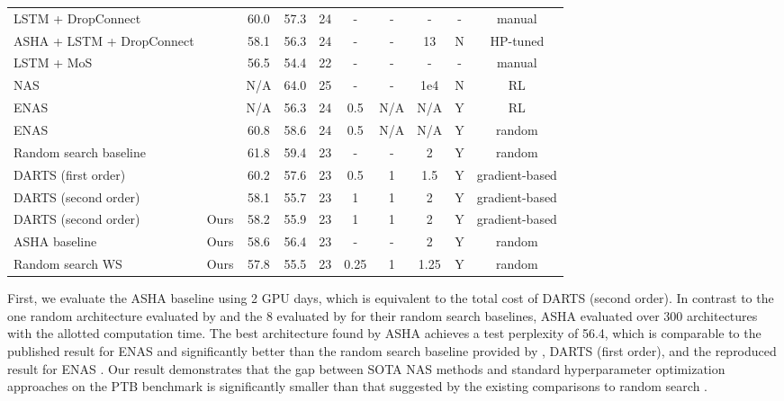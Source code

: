 \documentclass[acmlarge, nonacm]{acmart}
\begin{document}
\begin{table}[h]
{\begin{tabular}{lccccccccc}
\hline
LSTM + DropConnect & \citep{merity2018awd} & 60.0 & 57.3 & 24 & - & - & - & - & manual \\
ASHA + LSTM + DropConnect & \citep{asha} & 58.1 & 56.3 & 24 & - & - & 13 & N & HP-tuned\\
LSTM + MoS & \citep{yang2018breaking} & 56.5 & 54.4 & 22 & - & - & - & - & manual \\
\hline
NAS & \citep{nasRL} & N/A & 64.0 & 25 & - & - & 1e4 &  N & RL \\
ENAS & \citep{pham18ENAS} & N/A & 56.3 & 24 & 0.5 & N/A & N/A & Y & RL \\
ENAS & \citep{liu2018darts} & 60.8 & 58.6 & 24 & 0.5 & N/A & N/A &  Y & random \\
 Random search baseline & \citep{liu2018darts} & 61.8 & 59.4 & 23 & - & - & 2 & Y & random \\
 DARTS (first order)& \citep{liu2018darts}     &  60.2 & 57.6 & 23 & 0.5 & 1 & 1.5 & Y & gradient-based\\
 DARTS (second order)&  \citep{liu2018darts}&  58.1 & 55.7 & 23 & 1 & 1& 2 & Y & gradient-based \\
 \hline
 DARTS (second order)& Ours & 58.2 & 55.9 & 23 & 1 & 1 & 2&Y & gradient-based \\
 ASHA baseline  & Ours & 58.6 & 56.4 & 23 & - & - & 2 & Y & random \\
 Random search WS& Ours & 57.8 & 55.5 & 23 & 0.25 & 1 & 1.25 & Y & random \\
 \hline
 
\end{tabular}}
\end{table}

First, we evaluate the ASHA baseline using 2 GPU days, which is equivalent to the total cost of DARTS (second order). 
In contrast to the one random architecture evaluated by \citet{pham18ENAS} and the 8 evaluated by \citet{liu2018darts} for their random search baselines, ASHA evaluated over 300 architectures with the allotted computation time. The best architecture found by ASHA achieves a test perplexity of 56.4, which is comparable to the published result for ENAS and significantly better than the random search baseline provided by \citet{liu2018darts}, DARTS (first order), and the reproduced result for ENAS \citep{liu2018darts}.  Our result demonstrates that the gap between SOTA NAS methods and standard hyperparameter optimization approaches on the PTB benchmark is significantly smaller than that suggested by the existing comparisons to random search \citep{pham18ENAS, liu2018darts}.  
\end{document}
